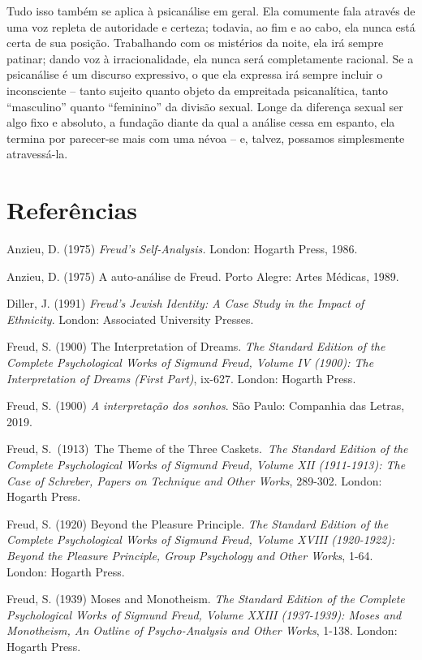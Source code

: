 Tudo isso também se aplica à psicanálise em geral. Ela comumente fala
através de uma voz repleta de autoridade e certeza; todavia, ao fim e ao
cabo, ela nunca está certa de sua posição. Trabalhando com os mistérios
da noite, ela irá sempre patinar; dando voz à irracionalidade, ela nunca
será completamente racional. Se a psicanálise é um discurso expressivo,
o que ela expressa irá sempre incluir o inconsciente -- tanto sujeito
quanto objeto da empreitada psicanalítica, tanto ``masculino'' quanto
``feminino'' da divisão sexual. Longe da diferença sexual ser algo fixo
e absoluto, a fundação diante da qual a análise cessa em espanto, ela
termina por parecer-se mais com uma névoa -- e, talvez, possamos
simplesmente atravessá-la.

\section{Referências}

Anzieu, D. (1975) \emph{Freud's Self-Analysis.} London: Hogarth Press,
1986.

Anzieu, D. (1975) A auto-análise de Freud. Porto Alegre: Artes Médicas,
1989.

Diller, J. (1991) \emph{Freud's Jewish Identity: A Case Study in the
Impact of Ethnicity}. London: Associated University Presses.

Freud, S. (1900) The Interpretation of Dreams. \emph{The Standard
Edition of the Complete Psychological Works of Sigmund Freud, Volume IV
(1900): The Interpretation of Dreams (First Part)}, ix-627. London:
Hogarth Press.

Freud, S. (1900) \emph{A interpretação dos sonhos}. São Paulo: Companhia
das Letras, 2019.

Freud, S.~(1913)~The Theme of the Three Caskets.~\emph{The Standard
Edition of the Complete Psychological Works of Sigmund Freud, Volume XII
(1911-1913): The Case of Schreber, Papers on Technique and Other Works},
289-302. London: Hogarth Press.

Freud, S. (1920) Beyond the Pleasure Principle. \emph{The Standard
Edition of the Complete Psychological Works of Sigmund Freud, Volume
XVIII (1920-1922): Beyond the Pleasure Principle, Group Psychology and
Other Works}, 1-64. London: Hogarth Press.

Freud, S. (1939) Moses and Monotheism. \emph{The Standard Edition of the
Complete Psychological Works of Sigmund Freud, Volume XXIII (1937-1939):
Moses and Monotheism, An Outline of Psycho-Analysis and Other Works},
1-138. London: Hogarth Press.

